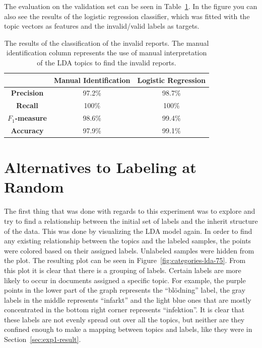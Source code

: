 The evaluation on the validation set can be seen in Table~\ref{tab:exp1-eval}.
In the figure you can also see the results of the logistic regression classifier, which was fitted with the topic vectors as features and the invalid/valid labels as targets.

\begin{table}[h!]
    \centering
    \begin{tabular}{|c|cc|}
        \hline
        & \textbf{Manual Identification} & \textbf{Logistic Regression} \\
        \hline
        \textbf{Precision} & 97.2\% & 98.7\% \\
        \textbf{Recall} & 100\% & 100\% \\
        \textbf{$F_1$-measure} & 98.6\% & 99.4\%\\
        \textbf{Accuracy} & 97.9\% & 99.1\%\\
        \hline
    \end{tabular}
    \caption{The results of the classification of the invalid reports. The manual identification column represents the use of manual interpretation of the LDA topics to find the invalid reports.}
    \label{tab:exp1-eval}
\end{table}

\section{Alternatives to Labeling at Random}

The first thing that was done with regards to this experiment was to explore and try to find a relationship between the initial set of labels and the inherit structure of the data.
This was done by visualizing the LDA model again.
In order to find any existing relationship between the topics and the labeled samples, the points were colored based on their assigned labels.
Unlabeled samples were hidden from the plot.
The resulting plot can be seen in Figure~\ref{fig:categories-lda-75}.
From this plot it is clear that there is a grouping of labels.
Certain labels are more likely to occur in documents assigned a specific topic.
For example, the purple points in the lower part of the graph represents the ``blödning'' label, the gray labels in the middle represents ``infarkt'' and the light blue ones that are mostly concentrated in the bottom right corner represents ``infektion''.
It is clear that these labels are not evenly spread out over all the topics, but neither are they confined enough to make a mapping between topics and labels, like they were in Section~\ref{sec:exp1-result}.

